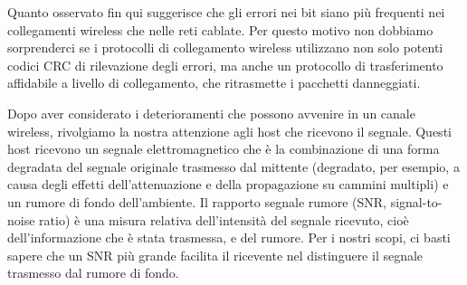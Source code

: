 Quanto osservato fin qui suggerisce che gli errori nei bit siano più frequenti nei collegamenti wireless che nelle reti cablate. Per questo motivo non dobbiamo sorprenderci se i protocolli di collegamento wireless utilizzano non solo potenti codici CRC di rilevazione degli errori, ma anche un protocollo di trasferimento affidabile a livello di
collegamento, che ritrasmette i pacchetti danneggiati.

Dopo aver considerato i deterioramenti che possono avvenire in un canale wireless, rivolgiamo la nostra attenzione agli host che ricevono il segnale. Questi host ricevono un segnale elettromagnetico che è la combinazione di una forma degradata del segnale originale trasmesso dal mittente (degradato, per esempio, a causa degli effetti dell’attenuazione e della propagazione su cammini multipli) e un rumore di fondo dell’ambiente. Il rapporto segnale rumore (SNR, signal-to-noise ratio) è una misura relativa dell’intensità del segnale ricevuto, cioè dell’informazione che è stata trasmessa, e del rumore. Per i nostri scopi, ci basti sapere che un SNR più grande facilita il ricevente nel distinguere il segnale trasmesso dal rumore di fondo.


